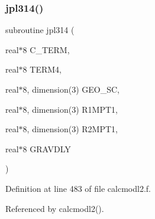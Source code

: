 \subsubsection{\texorpdfstring{jpl314()}{jpl314()}}
{\footnotesize\ttfamily subroutine jpl314 (\begin{DoxyParamCaption}\item[{real$\ast$8}]{C\+\_\+\+T\+E\+RM,  }\item[{real$\ast$8}]{T\+E\+R\+M4,  }\item[{real$\ast$8, dimension(3)}]{G\+E\+O\+\_\+\+SC,  }\item[{real$\ast$8, dimension(3)}]{R1\+M\+P\+T1,  }\item[{real$\ast$8, dimension(3)}]{R2\+M\+P\+T1,  }\item[{real$\ast$8}]{G\+R\+A\+V\+D\+LY }\end{DoxyParamCaption})}



Definition at line 483 of file calcmodl2.\+f.



Referenced by calcmodl2().


